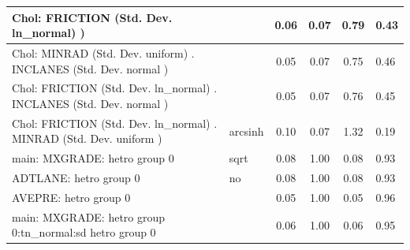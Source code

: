 \begin{table}
\begin{center}
\begin{tabular}{|l|l|c|c|c|l|}
			\hline
			 Chol: FRICTION (Std. Dev. ln_normal) ) &  & 0.06 & 0.07 & 0.79 & 0.43 \\
			\hline
			 Chol: MINRAD (Std. Dev. uniform) . INCLANES (Std. Dev.   normal ) &  & 0.05 & 0.07 & 0.75 & 0.46 \\
			\hline
			 Chol: FRICTION (Std. Dev. ln_normal) . INCLANES (Std. Dev.   normal ) &  & 0.05 & 0.07 & 0.76 & 0.45 \\
			\hline
			 Chol: FRICTION (Std. Dev. ln_normal) . MINRAD (Std. Dev.   uniform ) & arcsinh & 0.10 & 0.07 & 1.32 & 0.19 \\
			\hline
			main: MXGRADE: hetro group 0 & sqrt & 0.08 & 1.00 & 0.08 & 0.93 \\
			\hline
			ADTLANE: hetro group 0 & no & 0.08 & 1.00 & 0.08 & 0.93 \\
			\hline
			AVEPRE: hetro group 0 &  & 0.05 & 1.00 & 0.05 & 0.96 \\
			\hline
			main: MXGRADE: hetro group 0:tn_normal:sd  hetro group 0 &  & 0.06 & 1.00 & 0.06 & 0.95 \\
			\hline
		\end{tabular}
	\end{center}
\end{table}
